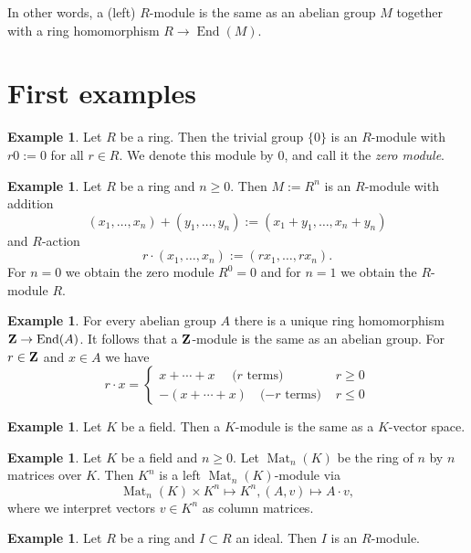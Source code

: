 \documentclass[11pt]{amsbook}
\DeclareMathOperator{\End}{\mathrm{End}}
\DeclareMathOperator\Mat{Mat}
\theoremstyle{plain}
\theoremstyle{definition}
\newtheorem{example}[theorem]{Example}
\begin{document}
In other words, a (left) $R$-module is the same as an abelian group $M$ together with a ring homomorphism $R\to \End(M)$. 




\section{First examples}

\begin{example} Let $R$ be a ring. Then the trivial group $\{0\}$ is an $R$-module with $r0:=0$ for all $r\in R$. We denote this module by $0$, and call it the \emph{zero module}.
\end{example}

\begin{example} Let $R$ be a ring and $n\geq 0$. Then $M:=R^n$ is an $R$-module with addition
\[
	(x_1,\ldots, x_n) + (y_1,\ldots, y_n) := (x_1+y_1, \ldots, x_n+y_n)
\]
and $R$-action
\[
	r\cdot (x_1,\ldots, x_n) := (rx_1,\ldots, rx_n).
\]
For $n=0$ we obtain the zero module $R^0=0$ and for $n=1$ we obtain the $R$-module $R$.
\end{example}

\begin{example} For every abelian group $A$ there is a unique ring homomorphism 
$\bZ \to \End(A)$. It follows that a ${\mathbf{Z}}$-module is the same as an abelian group.
For $r\in {\mathbf{Z}}$ and $x\in A$ we have
\[
	r \cdot x = \begin{cases} x + \cdots + x\quad \text{ ($r$ terms) } & r \geq 0 \\
	-(x+ \cdots + x ) \quad\text{($-r$ terms) } & r \leq 0 \end{cases}
\]
\end{example}

\begin{example} Let $K$ be a field. Then a $K$-module is the same as a $K$-vector space.
\end{example}

\begin{example} Let $K$ be a field and $n\geq 0$. Let $\Mat_n(K)$ be the ring of $n$ by $n$ matrices over $K$. Then $K^n$ is a left $\Mat_n(K)$-module via
\[
	\Mat_n(K) \times K^n \mapsto K^n, (A, v) \mapsto A\cdot v,
\]
where we interpret vectors $v\in K^n$ as column matrices.
\end{example}


\begin{example} Let $R$ be a ring and $I\subset R$ an ideal. Then $I$ is an $R$-module.
\end{example}
\end{document}
